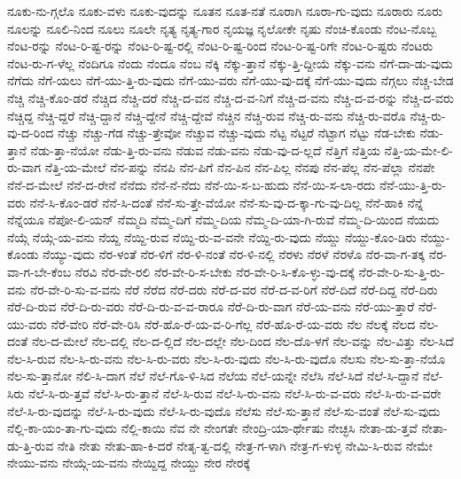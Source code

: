 {ನೂಕು-ನು-ಗ್ಗಲೊ
ನೂಕು-ವಳು
ನೂಕು-ವುದನ್ನು
ನೂತನ
ನೂತ-ನತೆ
ನೂರಾಗಿ
ನೂರಾ-ಗು-ವುದು
ನೂರಾರು
ನೂರು
ನೂಲನ್ನು
ನೂಲಿ-ನಿಂದ
ನೂಲು
ನೂಲೇ
ನೃತ್ಯ
ನೃತ್ಯ-ಗಾರ
ನೃಯಜ್ಞ
ನೃಲೋಕೇ
ನೃಷು
ನೆಂಚಿ-ಕೊಂಡು
ನೆಂಟ-ನೊಬ್ಬ
ನೆಂಟ-ರನ್ನು
ನೆಂಟ-ರಿ-ಷ್ಟ-ರನ್ನು
ನೆಂಟ-ರಿ-ಷ್ಟ-ರಲ್ಲಿ
ನೆಂಟ-ರಿ-ಷ್ಟ-ರಿಂದ
ನೆಂಟ-ರಿ-ಷ್ಟ-ರಿಗೇ
ನೆಂಟ-ರಿ-ಷ್ಟರು
ನೆಂಟರು
ನೆಂಟ-ರು-ಗ-ಳೆಲ್ಲ
ನೆಂದಿಗೂ
ನೆಂದು
ನೆಂದೂ
ನೆಂಬ
ನೆಕ್ಕಿ
ನೆಕ್ಕು-ತ್ತಾನೆ
ನೆಕ್ಕು-ತ್ತಿ-ದ್ದೀಯೆ
ನೆಕ್ಕು-ವನು
ನೆಗೆ-ದಾ-ಡು-ವುದು
ನೆಗೆದು
ನೆಗೆ-ಯಲು
ನೆಗೆ-ಯು-ತ್ತಿ-ರು-ವುದು
ನೆಗೆ-ಯು-ವರು
ನೆಗೆ-ಯು-ವು-ದಕ್ಕೆ
ನೆಗೆ-ಯು-ವುದು
ನೆಗ್ಗಲು
ನೆಚ್ಚ-ಬೇಡ
ನೆಚ್ಚಿ
ನೆಚ್ಚಿ-ಕೊಂ-ಡರೆ
ನೆಚ್ಚಿದ
ನೆಚ್ಚಿ-ದರೆ
ನೆಚ್ಚಿ-ದ-ವನ
ನೆಚ್ಚಿ-ದ-ವ-ನಿಗೆ
ನೆಚ್ಚಿ-ದ-ವನು
ನೆಚ್ಚಿ-ದ-ವ-ರನ್ನು
ನೆಚ್ಚಿ-ದ-ವರು
ನೆಚ್ಚಿದ್ದ
ನೆಚ್ಚಿ-ದ್ದರೆ
ನೆಚ್ಚಿ-ದ್ದಾನೆ
ನೆಚ್ಚಿ-ದ್ದೇನೆ
ನೆಚ್ಚಿ-ದ್ದೇವೆ
ನೆಚ್ಚಿನ
ನೆಚ್ಚಿ-ರುವ
ನೆಚ್ಚಿ-ರು-ವನು
ನೆಚ್ಚಿ-ರು-ವರೊ
ನೆಚ್ಚಿ-ರು-ವು-ದ-ರಿಂದ
ನೆಚ್ಚು
ನೆಚ್ಚು-ಗೆಡ
ನೆಚ್ಚು-ತ್ತೇವೋ
ನೆಚ್ಚುವ
ನೆಚ್ಚು-ವುದು
ನೆಟ್ಟ
ನೆಟ್ಟರೆ
ನೆಟ್ಟಾಗ
ನೆಟ್ಟು
ನೆಡ-ಬೇಕು
ನೆಡು-ತ್ತಾನೆ
ನೆಡು-ತ್ತಾ-ನೆಯೋ
ನೆಡು-ತ್ತಿ-ರು-ವನು
ನೆಡುವ
ನೆಡು-ವನು
ನೆಡು-ವು-ದ-ಲ್ಲದೆ
ನೆತ್ತಿಗೆ
ನೆತ್ತಿಯ
ನೆತ್ತಿ-ಯ-ಮೇ-ಲಿ-ರು-ವಾಗ
ನೆತ್ತಿ-ಯ-ಮೇಲೆ
ನೆನ-ಪನ್ನು
ನೆನಪಿ
ನೆನ-ಪಿಗೆ
ನೆನ-ಪಿನ
ನೆನ-ಪಿಲ್ಲ
ನೆನಪು
ನೆನ-ಪೆಲ್ಲ
ನೆನ-ಪೆಲ್ಲಾ
ನೆನಪೇ
ನೆನೆ-ದ-ಮೇಲೆ
ನೆನೆ-ದ-ರೇನೆ
ನೆನೆದು
ನೆನೆ-ನೆ-ನೆದು
ನೆನೆ-ಯಿ-ಸ-ಬ-ಹುದು
ನೆನೆ-ಯಿ-ಸ-ಲಾ-ರದು
ನೆನೆ-ಯು-ತ್ತಿ-ರು-ವರು
ನೆನೆ-ಸಿ-ಕೊಂ-ಡರೆ
ನೆನೆ-ಸಿ-ದಂತೆ
ನೆನೆ-ಸು-ತ್ತೇ-ವೆಯೋ
ನೆನೆ-ಸು-ವು-ದ-ಕ್ಕಾ-ಗು-ವು-ದಿಲ್ಲ
ನೆನೆ-ಹಾಕಿ
ನೆನ್ನೆ
ನೆನ್ನೆಯೂ
ನೆಪೋ-ಲಿ-ಯನ್
ನೆಮ್ಮದಿ
ನೆಮ್ಮ-ದಿಗೆ
ನೆಮ್ಮ-ದಿಯ
ನೆಮ್ಮ-ದಿ-ಯಾ-ಗಿ-ರುವೆ
ನೆಮ್ಮ-ದಿ-ಯಿಂದ
ನೆಯದು
ನೆಯ್ಗೆ
ನೆಯ್ಗೆ-ಯ-ವನು
ನೆಯ್ದ
ನೆಯ್ದಿ-ರುವ
ನೆಯ್ದಿ-ರು-ವ-ವನೇ
ನೆಯ್ದಿ-ರು-ವುದು
ನೆಯ್ದು
ನೆಯ್ದು-ಕೊಂ-ಡಿರು
ನೆಯ್ದು-ಕೊಂಡು
ನೆಯ್ಯು-ವುದು
ನೆರ-ಳಂತೆ
ನೆರ-ಳಿಗೆ
ನೆರ-ಳಿ-ನಂತೆ
ನೆರ-ಳಿ-ನಲ್ಲಿ
ನೆರಳು
ನೆರಳೆ
ನೆರಳೊ
ನೆರ-ವಾ-ಗ-ತಕ್ಕ
ನೆರ-ವಾ-ಗ-ಬೇ-ಕೆಂಬ
ನೆರವಿ
ನೆರ-ವೇ-ರಲಿ
ನೆರ-ವೇ-ರಿ-ಸ-ಬೇಕು
ನೆರ-ವೇ-ರಿ-ಸಿ-ಕೊ-ಳ್ಳು-ವು-ದಕ್ಕೆ
ನೆರ-ವೇ-ರಿ-ಸು-ತ್ತಿ-ರು-ವನು
ನೆರ-ವೇ-ರಿ-ಸು-ವ-ವನು
ನೆರೆ
ನೆರೆದ
ನೆರೆ-ದರು
ನೆರೆ-ದ-ವರ
ನೆರೆ-ದ-ವ-ರಿಗೆ
ನೆರೆ-ದಿದೆ
ನೆರೆ-ದಿದ್ದ
ನೆರೆ-ದಿರು
ನೆರೆ-ದಿ-ರುವ
ನೆರೆ-ದಿ-ರು-ವರು
ನೆರೆ-ದಿ-ರು-ವ-ವ-ರಾರೂ
ನೆರೆ-ದಿ-ರು-ವಾಗ
ನೆರೆ-ಯ-ವನು
ನೆರೆ-ಯು-ತ್ತಾರೆ
ನೆರೆ-ಯು-ವರು
ನೆರೆ-ವೇರಿ
ನೆರೆ-ವೇ-ರಿಸಿ
ನೆರೆ-ಹೊ-ರೆ-ಯ-ವ-ರಿ-ಗೆಲ್ಲ
ನೆರೆ-ಹೊ-ರೆ-ಯ-ವರು
ನೆಲ
ನೆಲಕ್ಕೆ
ನೆಲದ
ನೆಲ-ದಂತೆ
ನೆಲ-ದ-ಮೇಲೆ
ನೆಲ-ದಲ್ಲಿ
ನೆಲ-ದ-ಲ್ಲಿದೆ
ನೆಲ-ದಲ್ಲೇ
ನೆಲ-ದಿಂದ
ನೆಲ-ದೊ-ಳಗೆ
ನೆಲ-ವನ್ನು
ನೆಲ-ವಿತ್ತು
ನೆಲ-ಸಿದೆ
ನೆಲ-ಸಿ-ರುವ
ನೆಲ-ಸಿ-ರು-ವನು
ನೆಲ-ಸಿ-ರು-ವರು
ನೆಲ-ಸಿ-ರು-ವುದು
ನೆಲ-ಸಿ-ರು-ವುದೊ
ನೆಲಸು
ನೆಲ-ಸು-ತ್ತಾ-ನೆಯೊ
ನೆಲ-ಸು-ತ್ತಾನೋ
ನೆಲಿ-ಸಿ-ದಾಗ
ನೆಲೆ
ನೆಲೆ-ಗೊ-ಳಿ-ಸಿದ
ನೆಲೆಯ
ನೆಲೆ-ಯನ್ನೇ
ನೆಲೆಸಿ
ನೆಲೆ-ಸಿದೆ
ನೆಲೆ-ಸಿ-ದ್ದಾನೆ
ನೆಲೆ-ಸಿರು
ನೆಲೆ-ಸಿ-ರು-ತ್ತವೆ
ನೆಲೆ-ಸಿ-ರು-ತ್ತಾನೆ
ನೆಲೆ-ಸಿ-ರುವ
ನೆಲೆ-ಸಿ-ರು-ವನು
ನೆಲೆ-ಸಿ-ರು-ವ-ವರು
ನೆಲೆ-ಸಿ-ರು-ವ-ವರೇ
ನೆಲೆ-ಸಿ-ರು-ವುದನ್ನು
ನೆಲೆ-ಸಿ-ರು-ವುದು
ನೆಲೆ-ಸಿ-ರು-ವುದೊ
ನೆಲೆಸು
ನೆಲೆ-ಸು-ತ್ತಾನೆ
ನೆಲೆ-ಸು-ವಂತೆ
ನೆಲೆ-ಸು-ವುದು
ನೆಲ್ಲಿ-ಕಾ-ಯಂ-ತಾ-ಗು-ವುದು
ನೆಲ್ಲಿ-ಕಾಯಿ
ನೆವ
ನೇ
ನೇಂಗತೇ
ನೇಂದ್ರಿ-ಯಾ-ರ್ಥೇಷು
ನೇಚ್ಛಸಿ
ನೇತಾ-ಡು-ತ್ತವೆ
ನೇತಾ-ಡು-ತ್ತಿ-ರುವ
ನೇತಿ
ನೇತು
ನೇತು-ಹಾ-ಕಿ-ದರೆ
ನೇತೃ-ತ್ವ-ದಲ್ಲಿ
ನೇತ್ರ-ಗ-ಳಾಗಿ
ನೇತ್ರ-ಗ-ಳುಳ್ಳ
ನೇಮಿ-ಸಿ-ರುವ
ನೇಮೇ
ನೇಯು-ವನು
ನೇಯ್ಗೆ-ಯ-ವನು
ನೇಯ್ದಿದ್ದ
ನೇಯ್ದು
ನೇರ
ನೇರಕ್ಕೆ
}
